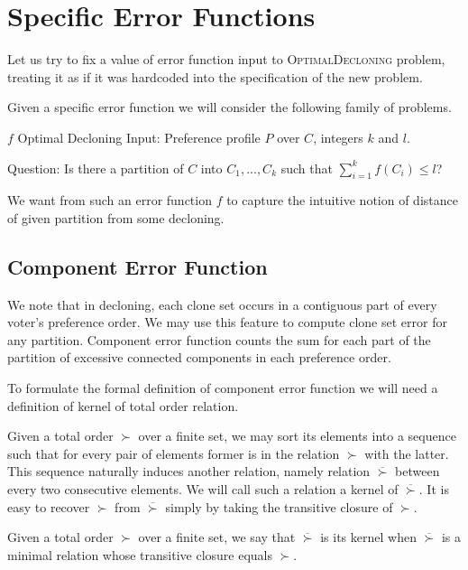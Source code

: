 \section{Specific Error Functions}

Let us try to fix a value of error function input to \textsc{OptimalDecloning} problem,
treating it as if it was hardcoded into the specification of the new problem.

Given a specific error function we will consider the following family of problems.

\begin{problem}{ $f$ Optimal Decloning}
	Input: Preference profile $P$ over $C$, integers $k$ and $l$.

	Question: Is there a partition of $C$ into $C_1, ..., C_k$ such that $\sum_{i=1}^k f(C_i) \leq l$?
\end{problem}

We want from such an error function $f$ to capture the intuitive notion
of distance of given partition from some decloning.

\subsection{Component Error Function}

We note that in decloning, each clone set occurs in a contiguous part of every voter's preference order.
We may use this feature to compute clone set error for any partition.
Component error function counts the sum for each part of the partition of excessive connected components in each preference order.

To formulate the formal definition of component error function we will need a definition of kernel of total order relation.

Given a total order $\succ$ over a finite set, we may sort its elements into a sequence
such that for every pair of elements former is in the relation $\succ$ with the latter.
This sequence naturally induces another relation, namely relation $\overline{\succ}$
between every two consecutive elements.
We will call such a relation a kernel of $\overline{\succ}$.
It is easy to recover $\succ$ from $\overline{\succ}$ simply by taking the transitive closure of $\succ$.

\begin{defn}
Given a total order $\succ$ over a finite set, we say that $\overline{\succ}$ is its kernel when
$\overline{\succ}$ is a minimal relation whose transitive closure equals $\succ$.
\end{defn}

